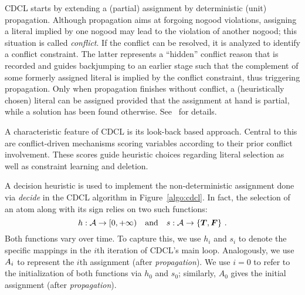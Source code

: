 CDCL starts by extending a (partial) {assignment} by deterministic (unit) propagation.
Although propagation aims at forgoing nogood violations,
assigning a literal implied by one nogood may lead to the violation of another nogood;
this situation is called \emph{conflict}.
If the conflict can be resolved, %
it is analyzed to identify a conflict constraint.
The latter represents a ``hidden'' conflict reason that is recorded and
guides backjumping to an earlier stage such that
the complement of some formerly assigned literal is implied by the conflict constraint,
thus triggering propagation.
Only when propagation finishes without conflict,
a (heuristically chosen) literal can be assigned %
provided that the assignment at hand is partial,
while a {solution} %
has been found otherwise.
%
See~\cite{SATHandbook} for details.

A characteristic feature of CDCL is its look-back based approach.
Central to this are conflict-driven mechanisms scoring variables according to their prior conflict involvement.
These scores guide heuristic choices regarding literal selection as well as constraint learning and deletion.

A decision heuristic is used to implement the non-deterministic assignment done via
\emph{decide} in the CDCL algorithm in Figure~\ref{algo:cdcl}.
In fact,
the selection of an atom along with its sign relies on two such functions:
\[
h: \mathcal{A}\to[0,+\infty)
\quad\text{and}\quad
s: \mathcal{A}\to\{\boldsymbol{T},\boldsymbol{F}\}
\ .
\]
Both functions vary over time.
To capture this, we use $h_i$ and $s_i$ to denote the specific mappings in the $i$th iteration of CDCL's main loop.
Analogously, we use $A_i$ to represent the $i$th assignment (after \textit{propagation}).
We use $i=0$ to refer to the initialization of both functions via $h_0$ and $s_0$;
similarly, $A_0$ gives the initial assignment (after \textit{propagation}).

